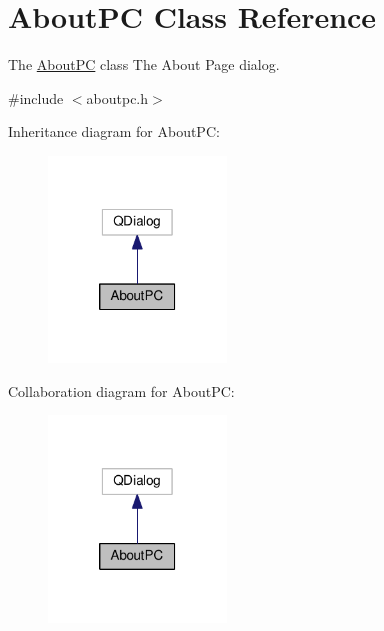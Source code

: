 \hypertarget{class_about_p_c}{\section{About\-P\-C Class Reference}
\label{class_about_p_c}
}


The \hyperlink{class_about_p_c}{About\-P\-C} class The About Page dialog.  




{\ttfamily \#include $<$aboutpc.\-h$>$}



Inheritance diagram for About\-P\-C\-:
\nopagebreak
\begin{figure}[H]
\begin{center}
\leavevmode
\includegraphics[width=134pt]{class_about_p_c__inherit__graph}
\end{center}
\end{figure}


Collaboration diagram for About\-P\-C\-:
\nopagebreak
\begin{figure}[H]
\begin{center}
\leavevmode
\includegraphics[width=134pt]{class_about_p_c__coll__graph}
\end{center}
\end{figure}
